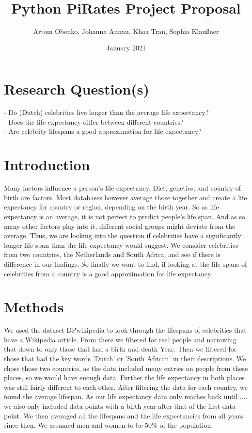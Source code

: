 \documentclass{article}
\title{Python PiRates Project Proposal}
\author{Artom Obenko, Johanna Annau, Khoa Tran, Sophia Klaußner }
\date{January 2021}
\begin{document}
	
\maketitle
	
\section{Research Question(s)}
	- Do (Dutch) celebrities live longer than the average life expectancy?\\
	- Does the life expectancy differ between different countries?\\
	- Are celebrity lifespans a good approximation for life expectancy?\\
	
\section{Introduction}
Many factors influence a person's life expectancy. Diet, genetics, and country of birth are factors. Most databases however average those together and create a life expectancy for country or region, depending on the birth year. %
So as life expectancy is an average, it is not perfect to predict people's life span. And as so many other factors play into it, different social groups might deviate from the average. Thus, we are looking into the question if celebrities have a significantly longer life span than the life expectancy would suggest. We consider celebrities from two countries, the Netherlands and South Africa, and see if there is difference in our findings. So finally we want to find, if looking at the life spans of celebrities from a country is a good approximation for life expectancy.

\section{Methods}
We used the dataset DPwikipedia to look through the lifespans of celebrities that have a Wikipedia article. From there we filtered for real people and narrowing that down to only those that had a birth and death Year. Then we filtered for those that had the key words 'Dutch' or 'South African' in their descriptions. We chose those two countries, as the data included many entries on people from these places, so we would have enough data. Further the life expectancy in both places was still fairly different to each other. After filtering the data for each country, we found the average lifespan. As our life expectancy data only reaches back until .... we also only included data points with a birth year after that of the first data point. We then averaged all the lifespans and the life expectancies from all years since then. We assumed men and women to be 50\% of the population.
 
\end{document}
